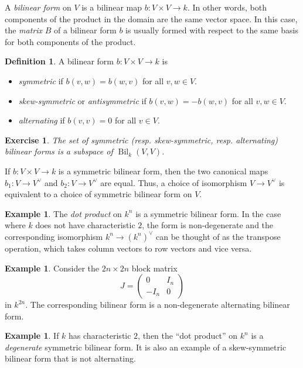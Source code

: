 \documentclass[12pt]{article}
\theoremstyle{plain}
\newtheorem{exercise}[theorem]{Exercise}
\theoremstyle{definition}
\newtheorem{definition}[theorem]{Definition}
\newtheorem{example}[theorem]{Example}
\theoremstyle{remark}
\numberwithin{equation}{section}
\begin{document}
A \emph{bilinear form} on $V$ is a bilinear map $b : V \times V \to k$.
In other words, both components of the product in the domain are the
same vector space.
In this case, the \emph{matrix} $B$ of a bilinear form $b$ is usually formed
with respect to the same basis for both components of the product.

\begin{definition}
A bilinear form $b: V \times V \to k$ is
\begin{itemize}
\item \emph{symmetric} if $b(v,w)=b(w,v)$ for all $v,w \in V$.
\item \emph{skew-symmetric} or \emph{antisymmetric}
if $b(v,w)=-b(w,v)$ for all $v,w \in V$.
\item \emph{alternating} if $b(v,v)=0$ for all $v \in V$.
\end{itemize}
\end{definition}

\begin{exercise}
The set of symmetric (resp. skew-symmetric, resp. alternating) bilinear
forms is a subspace of $\operatorname{Bil}_k(V,V)$.
\end{exercise}

If $b: V \times V \to k$ is a symmetric bilinear form,
then the two canonical maps $b_1 : V \to V^\vee$ and $b_2 : V \to
V^\vee$ are equal.  Thus, a choice of isomorphism $V \to V^\vee$
is equivalent to a choice of symmetric bilinear form on $V$.

\begin{example}
The \emph{dot product} on $k^n$ is a symmetric bilinear form.
In the case where $k$ does not have characteristic $2$, the form is
non-degenerate and the corresponding isomorphism
$k^n \to (k^n)^\vee$ can be thought of as the
transpose operation, which takes column vectors to row vectors and vice
versa.
\end{example}

\begin{example}
Consider the $2n \times 2n$ block matrix
\[
J = \begin{pmatrix} 0 & I_n \\ -I_n & 0 \end{pmatrix} 
\]
in $k^{2n}$.
The corresponding bilinear form is a non-degenerate alternating bilinear
form.
\end{example}

\begin{example}
If $k$ has characteristic $2$, then the ``dot product''
on $k^n$ is a \emph{degenerate} symmetric bilinear form.
It is also an example of a skew-symmetric bilinear form that is not
alternating.
\end{example}
\end{document}
